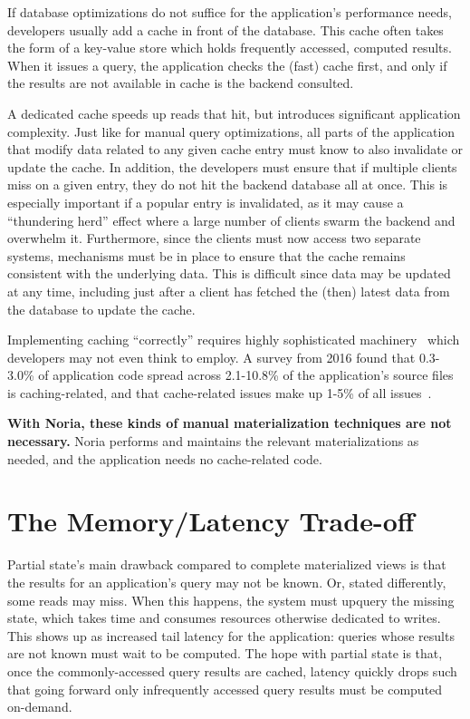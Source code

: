 If database optimizations do not suffice for the application's performance
needs, developers usually add a cache in front of the database. This cache
often takes the form of a key-value store which holds frequently accessed,
computed results. When it issues a query, the application checks the (fast)
cache first, and only if the results are not available in cache is the backend
consulted.

A dedicated cache speeds up reads that hit, but introduces significant
application complexity. Just like for manual query optimizations, all parts of
the application that modify data related to any given cache entry must know to
also invalidate or update the cache. In addition, the developers must ensure
that if multiple clients miss on a given entry, they do not hit the backend
database all at once. This is especially important if a popular entry is
invalidated, as it may cause a ``thundering herd'' effect where a large number
of clients swarm the backend and overwhelm it. Furthermore, since the clients
must now access two separate systems, mechanisms must be in place to ensure that
the cache remains consistent with the underlying data. This is difficult since
data may be updated at any time, including just after a client has fetched the
(then) latest data from the database to update the cache.

Implementing caching ``correctly'' requires highly sophisticated
machinery~\cite{facebook-memcache, transactional-cache, orm-cache, sql-cache}
which developers may not even think to employ. A survey from 2016 found that
0.3-3.0\% of application code spread across 2.1-10.8\% of the application's
source files is caching-related, and that cache-related issues make up 1-5\% of
all issues~\cite{caching-is-hard}.

\textbf{With Noria, these kinds of manual materialization techniques are not
necessary.} Noria performs and maintains the relevant materializations as
needed, and the application needs no cache-related code.

\section{The Memory/Latency Trade-off}
\label{s:eval:cost}

Partial state's main drawback compared to complete materialized views is
that the results for an application's query may not be known. Or, stated
differently, some reads may miss. When this happens, the system must upquery the
missing state, which takes time and consumes resources otherwise dedicated to
writes. This shows up as increased tail latency for the application: queries
whose results are not known must wait to be computed. The hope with partial
state is that, once the commonly-accessed query results are cached, latency
quickly drops such that going forward only infrequently accessed query results
must be computed on-demand.

